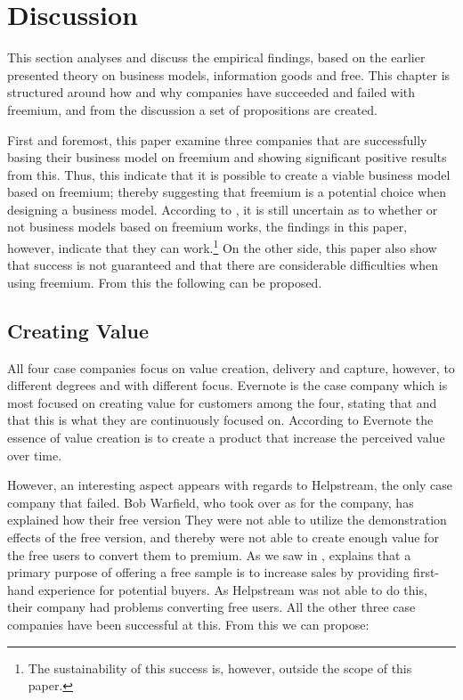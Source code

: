 \chapter{Discussion}
\label{chapter:discussion}

This section analyses and discuss the empirical findings, based on the earlier presented theory on business models, information goods and free. This chapter is structured around how and why companies have succeeded and failed with freemium, and from the discussion a set of propositions are created.

First and foremost, this paper examine three companies that are successfully basing their business model on freemium and showing significant positive results from this. Thus, this indicate that it is possible to create a viable business model based on freemium; thereby suggesting that freemium is a potential choice when designing a business model. According to \citet{teece2010}, it is still uncertain as to whether or not business models based on freemium works, the findings in this paper, however, indicate that they can work.\footnote{The sustainability of this success is, however, outside the scope of this paper.} On the other side, this paper also show that success is not guaranteed and that there are considerable difficulties when using freemium. From this the following can be proposed.


\section{Creating Value}

All four case companies focus on value creation, delivery and capture, however, to different degrees and with different focus. Evernote is the case company which is most focused on creating value for customers among the four, stating that  and that this is what they are continuously focused on. According to Evernote the essence of value creation is to create a product that increase the perceived value over time.

However, an interesting aspect appears with regards to Helpstream, the only case company that failed. Bob Warfield, who took over as  for the company, has explained how their free version  They were not able to utilize the demonstration effects of the free version, and thereby were not able to create enough value for the free users to convert them to premium. As we saw in , \citet{faugere2007} explains that a primary purpose of offering a free sample is to increase sales by providing first-hand experience for potential buyers. As Helpstream was not able to do this, their company had problems converting free users. All the other three case companies have been successful at this. From this we can propose:

